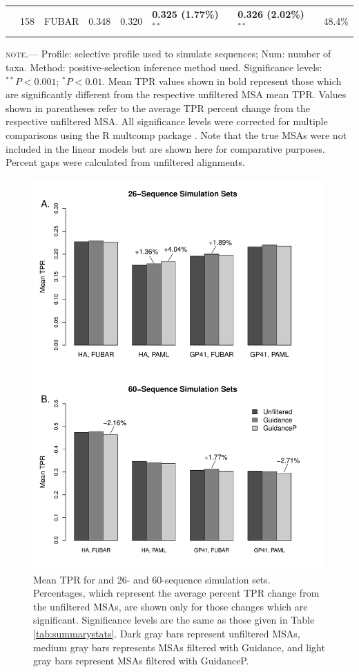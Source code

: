 \documentclass[11pt]{article}
\begin{document}
\begin{table}[htbp]
\begin{adjustwidth}{-1.85cm}{}
\begin{tabular}{l l l l l l l c}
 & 158 & FUBAR & 0.348 & 0.320 & \textbf{0.325 (1.77\%)$^{\ast\ast}$} & \textbf{0.326 (2.02\%)$^{\ast\ast}$} & 48.4\% \\
\end{tabular}
\newline
\textsc{note.}--- Profile: selective profile used to simulate sequences; Num: number of taxa. Method: positive-selection inference method used. Significance levels:  $^{\ast\ast} P < 0.001$; $^{\ast} P < 0.01$. Mean TPR values shown in bold represent those which are significantly different from the respective unfiltered MSA mean TPR. Values shown in parentheses refer to the average TPR percent change from the respective unfiltered MSA. All significance levels were corrected for multiple comparisons using the R multcomp package \citep{Hothorn2008}. Note that the true MSAs were not included in the linear models but are shown here for comparative purposes. Percent gaps were calculated from unfiltered alignments.
\end{adjustwidth}
\end{table}

\begin{figure}[H]
\centerline{\includegraphics[width=4.75in]{Figures/barplot.pdf}}
\caption{\label{barplot} Mean TPR for and 26- and  60-sequence simulation sets. Percentages, which represent the average percent TPR change from the unfiltered MSAs, are shown only for those changes which are significant. Significance levels are the same as those given in Table \ref{tab:summarystats}. Dark gray bars represent unfiltered MSAs, medium gray bars represents MSAs filtered with Guidance, and light gray bars represent MSAs filtered with GuidanceP.}
\end{figure}
\end{document}
